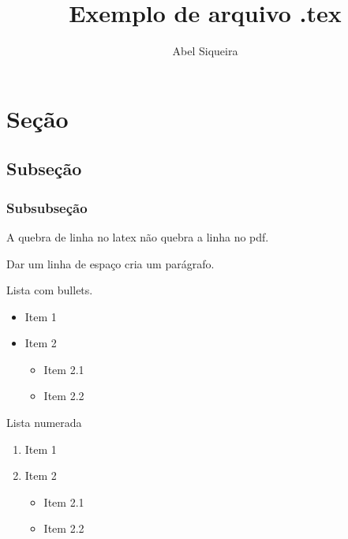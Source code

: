 \documentclass[letterpaper,11pt]{article}
\title{ Exemplo de arquivo .tex }
\author{ Abel Siqueira }
\date{}
\begin{document}
\maketitle

\section{Seção}
\subsection{Subseção}
\subsubsection{Subsubseção}

A quebra de linha
no latex não quebra a linha
no pdf.

Dar um linha de espaço cria um parágrafo.

Lista com bullets.
\begin{itemize}
 \item Item 1
 \item Item 2
 \begin {itemize}
  \item Item 2.1
  \item Item 2.2
 \end{itemize}
\end{itemize}

Lista numerada
\begin{enumerate}
 \item Item 1
 \item Item 2
 \begin{itemize}
  \item Item 2.1
  \item Item 2.2
 \end{itemize}
\end{enumerate}
\end{document}

